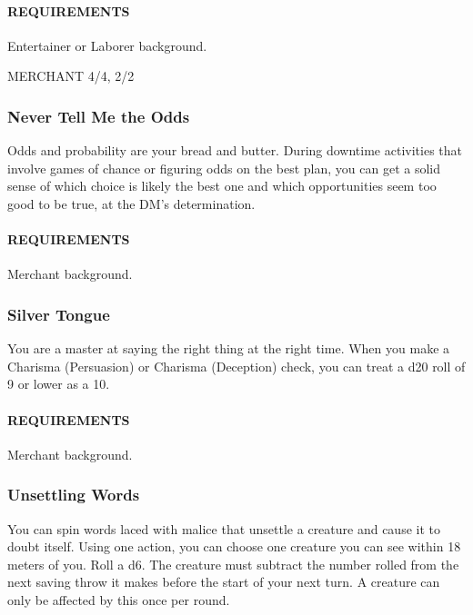         \paragraph{REQUIREMENTS} Entertainer or Laborer background.

MERCHANT 4/4, 2/2
    \subsubsection{Never Tell Me the Odds} \label{feat::nevertellmetheodds}
        Odds and probability are your bread and butter.
        During downtime activities that involve games of chance or figuring odds on the best plan, you can get a solid sense of which choice is likely the best one and which opportunities seem too good to be true, at the DM's determination.
        \paragraph{REQUIREMENTS} Merchant background.

    \subsubsection{Silver Tongue} \label{feat::silvertongue}
        You are a master at saying the right thing at the right time.
        When you make a Charisma (Persuasion) or Charisma (Deception) check, you can treat a d20 roll of 9 or lower as a 10.
        \paragraph{REQUIREMENTS} Merchant background.

    \subsubsection{Unsettling Words} \label{feat::unsettlingwords}
        You can spin words laced with malice that unsettle a creature and cause it to doubt itself.
        Using one action, you can choose one creature you can see within 18 meters of you.
        Roll a d6.
        The creature must subtract the number rolled from the next saving throw it makes before the start of your next turn.
        A creature can only be affected by this once per round.

